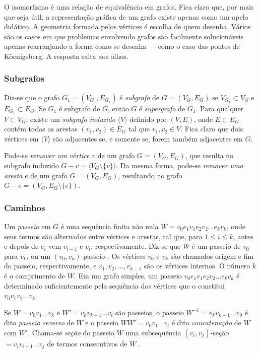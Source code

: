 O isomorfismo é uma relação de equivalência em grafos. Fica claro que, por mais que seja útil, a representação gráfica de um grafo existe apenas como um apelo didático. A geometria formada pelos vértices é escolha de quem desenha. Vários são os casos em que problemas envolvendo grafos são facilmente solucionáveis apenas rearranjando a forma como se desenha --- como o caso das pontes de Köenigsberg. A resposta salta aos olhos.

\subsubsection{Subgrafos}

Diz-se que o grafo $G_1 = (V_{G_1}, E_{G_1})$ é \textit{subgrafo} de $G = (V_G, E_G)$ se $V_{G_1} \subset V_G$ e $E_{G_1} \subset E_G$. Se $G_1$ é subgrafo de $G$, então $G$ é \textit{supergrafo} de $G_1$. Para qualquer $V \subset V_G$, existe um \textit{subgrafo induzido} $\langle V \rangle$ definido por $(V, E)$, onde $E \subset E_G$ contém todas as arestas $(v_1, v_2) \in E_G$ tal que $v_1, v_2 \in V$. 
Fica claro que dois vértices em $\langle V \rangle$ são adjacentes se, e somente se, forem também adjacentes em $G$.

Pode-se \textit{remover um vértice} $v$ de um grafo $G = (V_G, E_G)$, que resulta no subgrafo induzido $G - v = \langle V_G \setminus \{v\}\rangle$. Da mesma forma, pode-se \textit{remover uma aresta} $e$ de um grafo $G = (V_G, E_G)$, resultando no grafo $G-e = (V_G, E_G \setminus \{e\})$.

\subsubsection{Caminhos}

Um \textit{passeio} em $G$ é uma sequência finita não nula $W = v_0e_1v_1e_2v_2\dots e_kv_k$, onde seus termos são alternados entre vértices e arestas, tal que, para $1\leq i \leq k$, antes e depois de $e_i$ vem $v_{i-1}$ e $v_i$, respectivamente. Diz-se que $W$ é um passeio de $v_0$ para $v_k$, ou um $(v_0,v_k)$-passeio \cite{graphTheoryApplicationsBondy}. Os vértices $v_0$ e $v_k$ são chamados origem e fim do passeio, respectivamente, e $v_1,v_2,\dots,v_{k-1}$ são os vértices internos. O número $k$ é o comprimento de $W$. 
Em um grafo simples, um passeio $v_0e_1v_1e_2v_2\dots e_kv_k$ é determinado suficientemente pela sequência dos vértices que o constitui $v_0v_1v_2\dots v_k$.

Se $W=v_0v_1\dots v_k$ e $W' = v_kv_{k+1}\dots v_l$ são passeios, o passeio $W^{-1} = v_kv_{k-1}\dots v_0$ é dito \textit{passeio reverso} de $W$ e o passeio $WW' = v_0v_1\dots v_l$ é dito \textit{concatenação} de $W$ com $W'$. Chama-se \textit{seção} do passeio $W$ uma subsequência $(v_i,v_j)$-seção $= v_iv_{i+1}\dots v_j$ de termos consecutivos de $W$ \cite{graphTheoryApplicationsBondy}. 

